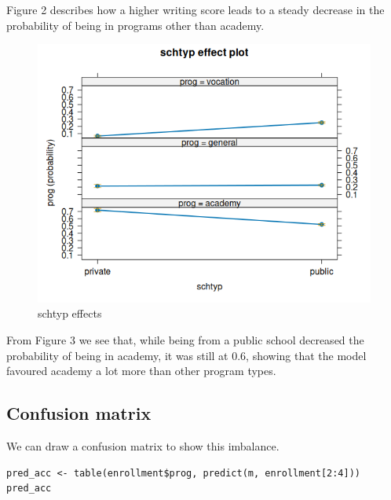 \documentclass[12pt]{article}
\begin{document}
Figure 2 describes how a higher writing score leads to a steady decrease in the probability of being in programs other than academy.
\clearpage 

\begin{figure}[ht]
\centering
\includegraphics[scale=0.7]{Rplot03.png}
\caption{schtyp effects}
\end{figure}

From Figure 3 we see that, while being from a public school decreased the probability of being in academy, it was still at 0.6, showing that the model favoured academy a lot more than other program types. 

\clearpage

\subsection{Confusion matrix}

We can draw a confusion matrix to show this imbalance.
\begin{verbatim}
pred_acc <- table(enrollment$prog, predict(m, enrollment[2:4]))
pred_acc
\end{verbatim}
\end{document}
